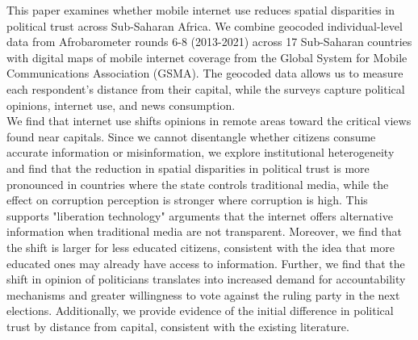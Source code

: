 \documentclass[11pt]{article}
\begin{document}
This paper examines whether mobile internet use reduces spatial disparities in political trust across Sub-Saharan Africa.
We combine geocoded individual-level data from Afrobarometer rounds 6-8 (2013-2021) across 17 Sub-Saharan countries with digital maps of mobile internet coverage from the Global System for Mobile Communications Association (GSMA).
The geocoded data allows us to measure each respondent's distance from their capital, while the surveys capture political opinions, internet use, and news consumption.\\

We find that internet use shifts opinions in remote areas toward the critical views found near capitals.
Since we cannot disentangle whether citizens consume accurate information or misinformation, we explore institutional heterogeneity and find that the reduction in spatial disparities in political trust is more pronounced in countries where the state controls traditional media, while the effect on corruption perception is stronger where corruption is high.
This supports "liberation technology" arguments that the internet offers alternative information when traditional media are not transparent.
Moreover, we find that the shift is larger for less educated citizens, consistent with the idea that more educated ones may already have access to information.
Further, we find that the shift in opinion of politicians translates into increased demand for accountability mechanisms and greater willingness to vote against the ruling party in the next elections.
Additionally, we provide evidence of the initial difference in political trust by distance from capital, consistent with the existing literature.\\
\end{document}
